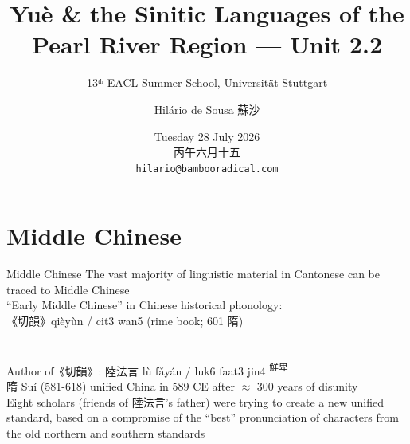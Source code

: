 \documentclass{beamer}
\title[Pearl River Sinitic]{Yuè \& the Sinitic Languages of the Pearl River Region --- Unit 2.2}
\subtitle{13ᵗʰ EACL Summer School, Universität Stuttgart}
\author{Hilário de Sousa 蘇沙}
\institute{EHESS–CRLAO \\ {\tiny membre associé}}
\date{Tuesday 28 July 2026 \\ 丙午六月十五 \\ {\footnotesize \texttt{hilario@bambooradical.com}}}
\begin{document}
\begin{frame}
  \titlepage
\end{frame}

\section{Middle Chinese}

\begin{frame}[fragile]{Middle Chinese}
The vast majority of linguistic material in Cantonese can be traced to Middle Chinese\\
\bigskip
\enquote{Early Middle Chinese} {\footnotesize in Chinese historical phonology}:\\
《切韻》qièyùn / cit3 wan5  (rime book; 601 隋)\\
\smallskip
{}\\
\\
\bigskip
Author of《切韻》: 陸法言 lù fǎyán / luk6 faat3 jin4 \textsuperscript{鮮卑} \\  
\bigskip
{\footnotesize 隋 Suí (581-618) unified China in 589 CE after \(\approx \) 300 years of disunity\\
\medskip
Eight scholars (friends of 陸法言's father) were trying to create a new unified standard, based on a compromise of the \enquote{best} pronunciation of characters from the old northern and southern standards\\}
\end{frame}
\end{document}
